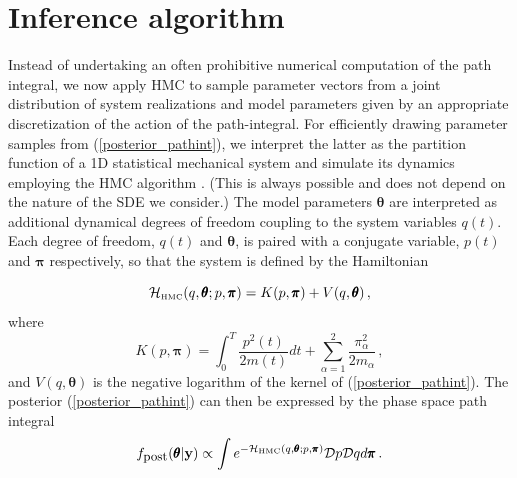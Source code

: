 \documentclass[11pt]{article}
\newcommand{\vc}[1]{{\bf #1 }}
\theoremstyle{definition}
\newcommand{\bt}{\pmb\theta}
\begin{document}
\section{Inference algorithm}

Instead of undertaking an often prohibitive numerical computation of the path integral, we now apply HMC to sample parameter vectors from a joint distribution of system realizations and model parameters given by an appropriate discretization of the action of the path-integral.
For efficiently drawing parameter samples from (\ref{posterior_pathint}), we interpret the latter as the partition function of a 1D statistical mechanical system and simulate its dynamics employing the HMC algorithm \cite{duane_1987}. (This is always possible and does not depend on the nature of the SDE we consider.) The model parameters  $\bt$ are interpreted as additional dynamical degrees of freedom coupling to the system variables $q(t)$. Each degree of freedom, $q(t)$ and $\bt$, is paired with a conjugate variable, $p(t)$ and ${\pmb\pi}$ respectively, so that the system is defined by the Hamiltonian

\begin{equation}\label{Hamiltonian}
    \mathcal{H}_{\mbox{\tiny HMC}}(q,\bt; p,{\pmb\pi})
    =
    K( p,{\pmb\pi}) + V( q,\bt)\,,
\end{equation}
where
\begin{equation}\label{K}
   K( p,{\pmb\pi})
   =
   \int_0^T \frac{ p^2(t)}{2m(t)}dt
   + \sum_{\alpha=1}^2\frac{\pi_\alpha^2}{2m_\alpha}\,,
\end{equation}
and $V( q,\bt)$ is the negative logarithm of the kernel of (\ref{posterior_pathint}).
The posterior (\ref{posterior_pathint}) can then
be expressed by the phase space path integral
\begin{equation}\label{phaseSpacePathInt}
    f_{\mbox{\small post}}(\bt | \vc y)
  \propto
  \int
  e^{-\mathcal {H}_{\mbox{\tiny HMC}}(q,\bt; p,{\pmb\pi})}
  {\mathcal Dp}
   {\mathcal Dq}
   d{\pmb\pi}
  \,.
\end{equation}
\end{document}
